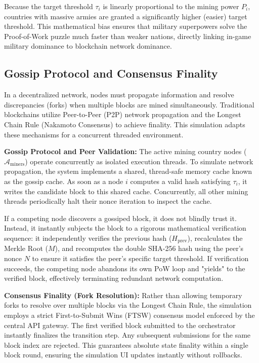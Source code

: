 Because the target threshold $\tau_i$ is linearly proportional to the mining power $P_i$, countries with massive armies are granted a significantly higher (easier) target threshold. This mathematical bias ensures that military superpowers solve the Proof-of-Work puzzle much faster than weaker nations, directly linking in-game military dominance to blockchain network dominance.

\subsection{Gossip Protocol and Consensus Finality}
In a decentralized network, nodes must propagate information and resolve discrepancies (forks) when multiple blocks are mined simultaneously. Traditional blockchains utilize Peer-to-Peer (P2P) network propagation and the Longest Chain Rule (Nakamoto Consensus) to achieve finality. This simulation adapts these mechanisms for a concurrent threaded environment.

\textbf{Gossip Protocol and Peer Validation:} The active mining country nodes ($\mathcal{A}_{\text{miners}}$) operate concurrently as isolated execution threads. To simulate network propagation, the system implements a shared, thread-safe memory cache known as the gossip cache. As soon as a node $i$ computes a valid hash satisfying $\tau_i$, it writes the candidate block to this shared cache. Concurrently, all other mining threads periodically halt their nonce iteration to inspect the cache. 

If a competing node discovers a gossiped block, it does not blindly trust it. Instead, it instantly subjects the block to a rigorous mathematical verification sequence: it independently verifies the previous hash ($H_{\text{prev}}$), recalculates the Merkle Root ($M$), and recomputes the double SHA-256 hash using the peer's nonce $N$ to ensure it satisfies the peer's specific target threshold. If verification succeeds, the competing node abandons its own PoW loop and "yields" to the verified block, effectively terminating redundant network computation.

\textbf{Consensus Finality (Fork Resolution):} Rather than allowing temporary forks to resolve over multiple blocks via the Longest Chain Rule, the simulation employs a strict First-to-Submit Wins (FTSW) consensus model enforced by the central API gateway. The first verified block submitted to the orchestrator instantly finalizes the transition step. Any subsequent submissions for the same block index are rejected. This guarantees absolute state finality within a single block round, ensuring the simulation UI updates instantly without rollbacks.

